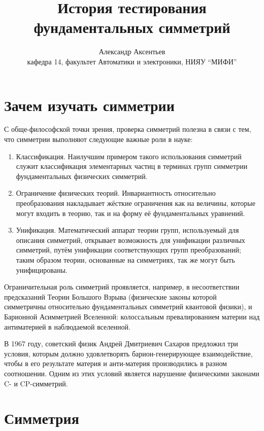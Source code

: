 \documentclass[14pt]{extarticle}
\begin{document}
\title{История тестирования фундаментальных симметрий}
\date{}
\author{Александр Аксентьев\\ кафедра 14, факультет Автоматики и электроники, НИЯУ ``МИФИ''}
\maketitle

\tableofcontents

\section*{Зачем изучать симметрии}

С обще-философской точки зрения, проверка симметрий полезна в связи с тем, что симметрии выполняют следующие важные роли в науке:
\begin{enumerate}
	\item Классификация. Наилучшим примером такого использования симметрий служит классификация элементарных частиц в терминах групп симметрии фундаментальных физических симметрий. 
	\item Ограничение физических теорий. Инвариантность относительно преобразования накладывает жёсткие ограничения как на величины, которые могут входить в теорию, так и на форму её фундаментальных уравнений.
	\item Унификация. Математический аппарат теории групп, используемый для описания симметрий, открывает возможность для унификации различных симметрий, путём унификации соответствующих групп преобразований; таким образом теории, основанные на симметриях, так же могут быть унифицированы.
\end{enumerate}

Ограничительная роль симметрий проявляется, например, в несоответствии предсказаний Теории Большого Взрыва (физические законы которой симметричны относительно фундаментальных симметрий квантовой физики), и Барионной Асимметрией Вселенной: колоссальным превалированием материи над антиматерией в наблюдаемой вселенной.

В 1967 году, советский физик Андрей Дмитриевич Сахаров предложил три условия, которым должно удовлетворять барион-генерирующее взаимодействие, чтобы в его результате материя и анти-материя производились в разном соотношении. Одним из этих условий является нарушение физическими законами C- и CP-симметрий.

\section{Симметрия}
\end{document}
